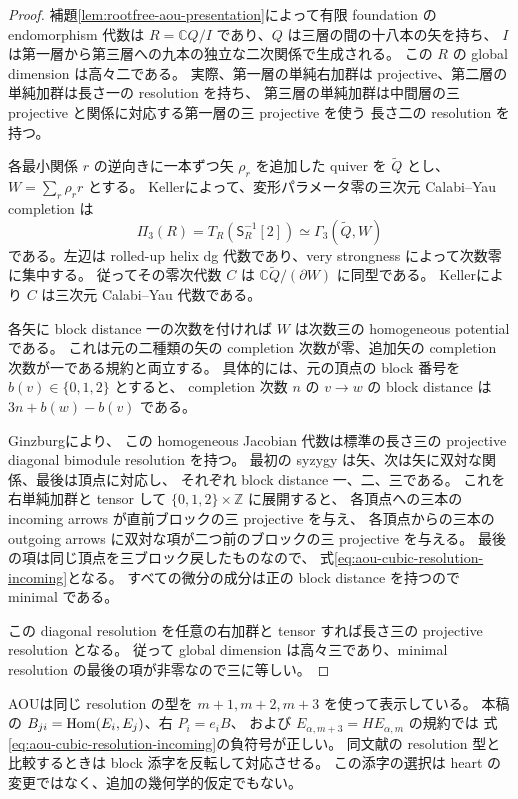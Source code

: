 \begin{proof}
補題\ref{lem:rootfree-aou-presentation}によって有限 foundation の endomorphism 代数は
$R=\mathbb C Q/I$ であり、$Q$ は三層の間の十八本の矢を持ち、
$I$ は第一層から第三層への九本の独立な二次関係で生成される。
この $R$ の global dimension は高々二である。
実際、第一層の単純右加群は projective、第二層の単純加群は長さ一の resolution を持ち、
第三層の単純加群は中間層の三 projective と関係に対応する第一層の三 projective を使う
長さ二の resolution を持つ。

各最小関係 $r$ の逆向きに一本ずつ矢 $\rho_r$ を追加した quiver を $\widetilde Q$ とし、
$W=\sum_r\rho_r r$ とする。
Keller\cite[Theorem 6.10]{KellerCY}によって、変形パラメータ零の三次元 Calabi--Yau completion は
\[
 \Pi_3(R)=T_R(\mathsf S_R^{-1}[2])
 \simeq\Gamma_3(\widetilde Q,W)
\]
である。左辺は rolled-up helix dg 代数であり、very strongness によって次数零に集中する。
従ってその零次代数 $C$ は $\mathbb C\widetilde Q/(\partial W)$ に同型である。
Keller\cite[Theorem 4.8]{KellerCY}により $C$ は三次元 Calabi--Yau 代数である。

各矢に block distance 一の次数を付ければ $W$ は次数三の homogeneous potential である。
これは元の二種類の矢の completion 次数が零、追加矢の completion 次数が一である規約と両立する。
具体的には、元の頂点の block 番号を $b(v)\in\{0,1,2\}$ とすると、
completion 次数 $n$ の $v\to w$ の block distance は $3n+b(w)-b(v)$ である。

Ginzburg\cite[Proposition 5.1.9, Corollary 5.4.3]{GinzburgCY}により、
この homogeneous Jacobian 代数は標準の長さ三の projective diagonal bimodule resolution を持つ。
最初の syzygy は矢、次は矢に双対な関係、最後は頂点に対応し、
それぞれ block distance 一、二、三である。
これを右単純加群と tensor して $\{0,1,2\}\times\mathbb Z$ に展開すると、
各頂点への三本の incoming arrows が直前ブロックの三 projective を与え、
各頂点からの三本の outgoing arrows に双対な項が二つ前のブロックの三 projective を与える。
最後の項は同じ頂点を三ブロック戻したものなので、
式\eqref{eq:aou-cubic-resolution-incoming}となる。
すべての微分の成分は正の block distance を持つので minimal である。

この diagonal resolution を任意の右加群と tensor すれば長さ三の projective resolution となる。
従って global dimension は高々三であり、minimal resolution の最後の項が非零なので三に等しい。
\end{proof}

\begin{remark}
AOU\cite[(4.13), Definition 4.1]{AOU}は同じ resolution の型を
$m+1,m+2,m+3$ を使って表示している。
本稿の $B_{ji}=\operatorname{Hom}(E_i,E_j)$、右 $P_i=e_iB$、
および $E_{\alpha,m+3}=HE_{\alpha,m}$ の規約では
式\eqref{eq:aou-cubic-resolution-incoming}の負符号が正しい。
同文献の resolution 型と比較するときは block 添字を反転して対応させる。
この添字の選択は heart の変更ではなく、追加の幾何学的仮定でもない。
\end{remark}


